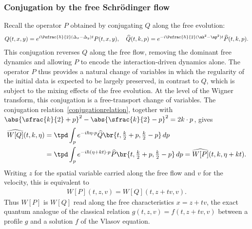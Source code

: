 \subsubsection{Conjugation by the free Schrödinger flow}\label{conjugationSection}
Recall the operator $P$ obtained by conjugating $Q$ along the free evolution:
\begin{align}\label{conjugationrelation}
Q(t,x,y)=e^{i\Psfrac{\hbar}{2}(\Delta_x-\Delta_y)t}P(t,x,y),\quad \widehat Q(t,k,p)=e^{-i\Psfrac{\hbar}{2}(\ak^2-\ap^2)t}\widehat P(t,k,p).
\end{align}
This conjugation reverses $Q$ along the free flow, removing the dominant free dynamics and allowing $P$ to encode the interaction-driven dynamics alone. The operator $P$ thus provides a natural change of variables in which the regularity of the initial data is expected to be largely preserved, in contrast to $Q$, which is subject to the mixing effects of the free evolution. At the level of the Wigner transform, this conjugation is a free-transport change of variables. The conjugation relation~\eqref{conjugationrelation}, together with $\abs{\sfrac{k}{2}+p}^2-\abs{\sfrac{k}{2}-p}^2=2k\cdot p$, gives
\begin{align*}
\widehat{W[Q]}(t,k,\eta)&=\tpd\int_p e^{-i\hbar\eta\cdot p}\widehat Q\br{t,\tfrac{k}{2}+p,\tfrac{k}{2}-p}\,dp\\
&=\tpd\int_p e^{-i\hbar(\eta+kt)\cdot p}\widehat P\br{t,\tfrac{k}{2}+p,\tfrac{k}{2}-p}\,dp=\widehat{W[P]}(t,k,\eta+kt).
\end{align*}
Writing $z$ for the spatial variable carried along the free flow and $v$ for the velocity, this is equivalent to
\begin{align*}
W[P](t,z,v)=W[Q](t,z+tv,v).
\end{align*}
Thus $W[P]$ is $W[Q]$ read along the free characteristics $x=z+tv$, the exact quantum analogue of the classical relation $g(t,z,v)=f(t,z+tv,v)$ between a profile $g$ and a solution $f$ of the Vlasov equation.

